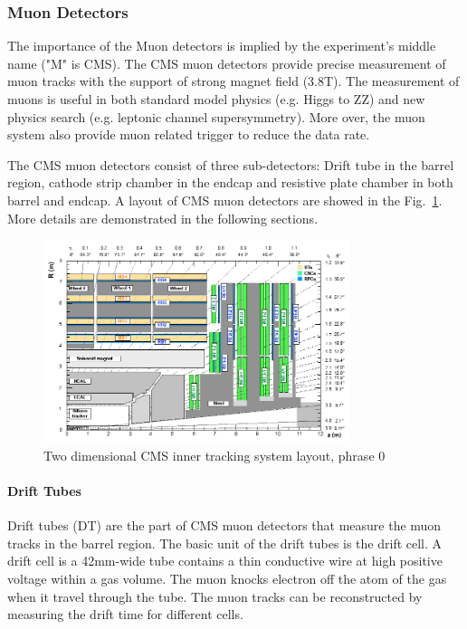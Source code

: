 \subsubsection{Muon Detectors}

The importance of the Muon detectors is implied by the experiment’s middle name ("M" is CMS). The CMS muon detectors provide precise measurement of muon tracks with the support of strong magnet field (3.8T). The measurement of muons is useful in both standard model physics (e.g. Higgs to ZZ) and new physics search (e.g. leptonic channel supersymmetry). More over, the muon system also provide muon related trigger to reduce the data rate.

The CMS muon detectors consist of three sub-detectors: Drift tube in the barrel region, cathode strip chamber in the endcap and resistive plate chamber in both barrel and endcap. A layout of CMS muon detectors are showed in the Fig.~\ref{fig:c3cms2dmuondets}. More details are demonstrated in the following sections. 

\begin{figure}[htbp]
 \begin{center}
  \includegraphics[width=0.8\textwidth]{figures/c3/c3_cms_2dmuondets.png}
 \end{center}
 \caption{Two dimensional CMS inner tracking system layout, phrase 0}
 \label{fig:c3cms2dmuondets}
\end{figure}

\paragraph{Drift Tubes}
Drift tubes (DT) are the part of CMS muon detectors that measure the muon tracks in the barrel region. The basic unit of the drift tubes is the drift cell. A drift cell is a 42mm-wide tube contains a thin conductive wire at high positive voltage within a gas volume. The muon knocks electron off the atom of the gas when it travel through the tube. The muon tracks can be reconstructed by measuring the drift time for different cells. 

